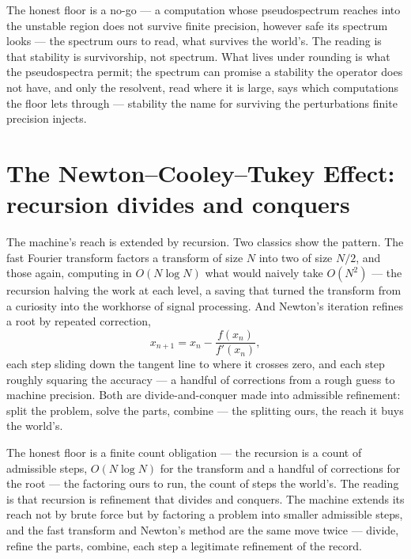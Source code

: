 The honest floor is a no-go --- a computation whose pseudospectrum reaches into the unstable region does not
survive finite precision, however safe its spectrum looks --- the spectrum ours to read, what survives the
world's. The reading is that stability is survivorship, not
spectrum. What lives under rounding is what the pseudospectra permit; the spectrum can promise a stability the
operator does not have, and only the resolvent, read where it is large, says which computations the floor lets
through --- stability the name for surviving the perturbations finite precision injects.

\section{The Newton--Cooley--Tukey Effect: recursion divides and conquers}
\label{se:newton-cooley-tukey}

The machine's reach is extended by recursion. Two classics show the pattern. The fast Fourier transform factors
a transform of size $N$ into two of size $N/2$, and those again, computing in $O(N \log N)$ what would naively
take $O(N^2)$ --- the recursion halving the work at each level, a saving that turned the transform from a
curiosity into the workhorse of signal processing. And Newton's iteration refines a root by repeated
correction,
\begin{equation}
  x_{n+1} = x_n - \frac{f(x_n)}{f'(x_n)},
\end{equation}
each step sliding down the tangent line to where it crosses zero, and each step roughly squaring the accuracy
--- a handful of corrections from a rough guess to machine precision. Both are divide-and-conquer made into
admissible refinement: split the problem, solve the parts, combine --- the splitting ours, the reach it buys
the world's.

The honest floor is a finite count obligation --- the recursion is a count of admissible steps, $O(N\log N)$
for the transform and a handful of corrections for the root --- the factoring ours to run, the count of steps
the world's. The reading is that recursion is refinement that
divides and conquers. The machine extends its reach not by brute force but by factoring a problem into smaller
admissible steps, and the fast transform and Newton's method are the same move twice --- divide, refine the
parts, combine, each step a legitimate refinement of the record.

\bigskip

